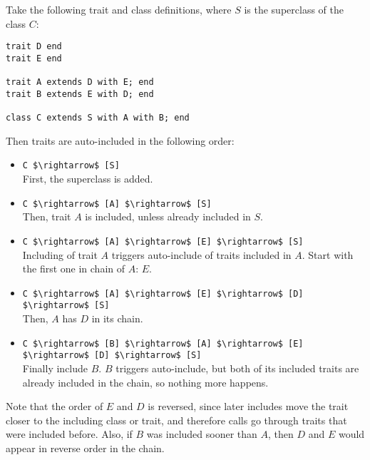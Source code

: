 \example Take the following trait and class definitions, where $S$ is the superclass of the class $C$:
\begin{lstlisting}
trait D end
trait E end

trait A extends D with E; end
trait B extends E with D; end

class C extends S with A with B; end
\end{lstlisting}
Then traits are auto-included in the following order:
\begin{itemize}
\item
\lstinline!C $\rightarrow$ [S]! \\
First, the superclass is added. 

\item
\lstinline!C $\rightarrow$ [A] $\rightarrow$ [S]! \\
Then, trait $A$ is included, unless already included in $S$. 

\item
\lstinline!C $\rightarrow$ [A] $\rightarrow$ [E] $\rightarrow$ [S]! \\
Including of trait $A$ triggers auto-include of traits included in $A$. Start with the first one in chain of $A$: $E$. 

\item
\lstinline!C $\rightarrow$ [A] $\rightarrow$ [E] $\rightarrow$ [D] $\rightarrow$ [S]! \\
Then, $A$ has $D$ in its chain. 

\item
\lstinline!C $\rightarrow$ [B] $\rightarrow$ [A] $\rightarrow$ [E] $\rightarrow$ [D] $\rightarrow$ [S]! \\
Finally include $B$. $B$ triggers auto-include, but both of its included traits are already included in the chain, so nothing more happens. 
\end{itemize}
Note that the order of $E$ and $D$ is reversed, since later includes move the trait closer to the including class or trait, and therefore  calls go through traits that were included before. Also, if $B$ was included sooner than $A$, then $D$ and $E$ would appear in reverse order in the chain. 

